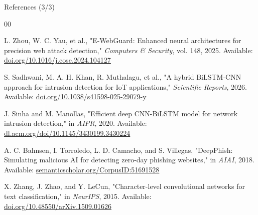 \documentclass[aspectratio=169,xcolor=dvipsnames]{beamer}
\begin{document}
\begin{frame}{References (3/3)}
\small
\begin{thebibliography}{00}








L. Zhou, W. C. Yau, et al., 
"E-WebGuard: Enhanced neural architectures for precision web attack detection," 
\textit{Computers \& Security}, vol. 148, 2025. \newline
Available: \href{https://doi.org/10.1016/j.cose.2024.104127}{doi.org/10.1016/j.cose.2024.104127}

S. Sadhwani, M. A. H. Khan, R. Muthalagu, et al., 
"A hybrid BiLSTM-CNN approach for intrusion detection for IoT applications," 
\textit{Scientific Reports}, 2026. \newline
Available: \href{https://doi.org/10.1038/s41598-025-29079-y}{doi.org/10.1038/s41598-025-29079-y}

J. Sinha and M. Manollas, 
"Efficient deep CNN-BiLSTM model for network intrusion detection," 
in \textit{AIPR}, 2020. \newline
Available: \href{https://dl.acm.org/doi/10.1145/3430199.3430224}{dl.acm.org/doi/10.1145/3430199.3430224}

A. C. Bahnsen, I. Torroledo, L. D. Camacho, and S. Villegas, 
"DeepPhish: Simulating malicious AI for detecting zero-day phishing websites," 
in \textit{AIAI}, 2018. \newline
Available: \href{https://api.semanticscholar.org/CorpusID:51691528}{semanticscholar.org/CorpusID:51691528}

X. Zhang, J. Zhao, and Y. LeCun, 
"Character-level convolutional networks for text classification," 
in \textit{NeurIPS}, 2015. \newline
Available: \href{https://doi.org/10.48550/arXiv.1509.01626}{doi.org/10.48550/arXiv.1509.01626}


\end{thebibliography}
\end{frame}

\end{document}
